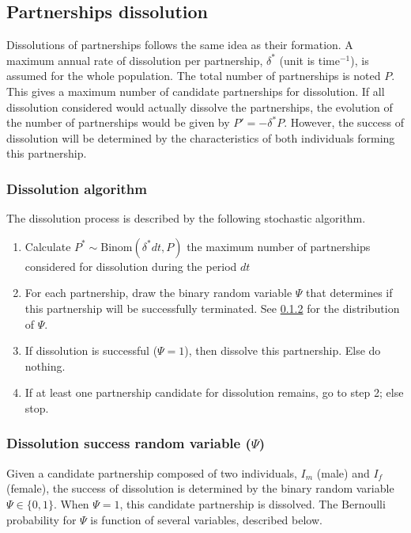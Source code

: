 \documentclass[11pt, onecolumn]{article}
\begin{document}
\subsection{Partnerships dissolution}

Dissolutions of partnerships follows the same idea as their formation. A maximum annual rate of dissolution per partnership, $\delta^*$ (unit is time$^{-1}$), is assumed for the whole population. The total number of partnerships is noted $P$. This gives a maximum number of candidate partnerships for dissolution. 
If all dissolution considered would actually dissolve the partnerships, the evolution of the number of partnerships would be given by $P'=-\delta^*P$.
However, the success of dissolution will be determined by the characteristics of both individuals forming this partnership.

\subsubsection{Dissolution algorithm}
The dissolution process is described by the following stochastic algorithm.

\begin{enumerate}
\item Calculate $P^* \sim \text{Binom}(\delta^*dt, P)$ the maximum number of partnerships considered for dissolution during the period $dt$

\item For each partnership, draw the binary random variable $\Psi$ that determines if this partnership will be successfully terminated. See \ref{dissolutionSuccessFormula} for the distribution of $\Psi$.

\item If dissolution is successful ($\Psi=1$), then dissolve this partnership. Else do nothing.

\item If at least one partnership candidate for dissolution remains, go to step 2; else stop.

\end{enumerate}

\subsubsection{Dissolution success random variable ($\Psi$)}
\label{dissolutionSuccessFormula}

Given a candidate partnership composed of two individuals, $I_m$ (male) and $I_f$ (female), the success of dissolution is determined by the binary random variable $\Psi\in\{0,1\}$. When $\Psi=1$, this candidate partnership is dissolved. The Bernoulli probability for $\Psi$ is function of several variables, described below.
\end{document}
